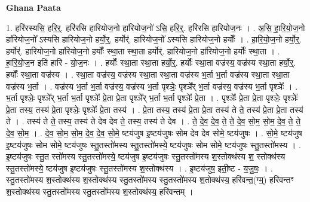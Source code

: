 \documentclass[17pt]{extarticle}
\begin{document}
\textbf{Ghana Paata } \newline

1. हरि॑रस्यसि॒ हरि॒र्॒. हरि॑रसि हारियोज॒नो हा॑रियोज॒नो॑ ऽसि॒ हरि॒र्॒. हरि॑रसि हारियोज॒नः । . अ॒सि॒ हा॒रि॒यो॒ज॒नो हा॑रियोज॒नो᳚ ऽस्यसि हारियोज॒नो हर्यो॒र्॒. हर्योर्॑. हारियोज॒नो᳚ ऽस्यसि हारियोज॒नो हर्योः᳚ । . हा॒रि॒यो॒ज॒नो हर्यो॒र्॒. हर्योर्॑. हारियोज॒नो हा॑रियोज॒नो हर्योः᳚ स्था॒ता स्था॒ता हर्योर्॑. हारियोज॒नो हा॑रियोज॒नो हर्योः᳚ स्था॒ता । . हा॒रि॒यो॒ज॒न इति॑ हारि - यो॒ज॒नः । . हर्योः᳚ स्था॒ता स्था॒ता हर्यो॒र्॒. हर्योः᳚ स्था॒ता वज्र॑स्य॒ वज्र॑स्य स्था॒ता हर्यो॒र्॒. हर्योः᳚ स्था॒ता वज्र॑स्य । . स्था॒ता वज्र॑स्य॒ वज्र॑स्य स्था॒ता स्था॒ता वज्र॑स्य भ॒र्ता भ॒र्ता वज्र॑स्य स्था॒ता स्था॒ता वज्र॑स्य भ॒र्ता । . वज्र॑स्य भ॒र्ता भ॒र्ता वज्र॑स्य॒ वज्र॑स्य भ॒र्ता पृश्ञेः॒ पृश्ञे᳚र् भ॒र्ता वज्र॑स्य॒ वज्र॑स्य भ॒र्ता पृश्ञेः᳚ । . भ॒र्ता पृश्ञेः॒ पृश्ञे᳚र् भ॒र्ता भ॒र्ता पृश्ञेः᳚ प्रे॒ता प्रे॒ता पृश्ञे᳚र् भ॒र्ता भ॒र्ता पृश्ञेः᳚ प्रे॒ता । . पृश्ञेः᳚ प्रे॒ता प्रे॒ता पृश्ञेः॒ पृश्ञेः᳚ प्रे॒ता तस्य॒ तस्य॑ प्रे॒ता पृश्ञेः॒ पृश्ञेः᳚ प्रे॒ता तस्य॑ । . प्रे॒ता तस्य॒ तस्य॑ प्रे॒ता प्रे॒ता तस्य॑ ते ते॒ तस्य॑ प्रे॒ता प्रे॒ता तस्य॑ ते । . तस्य॑ ते ते॒ तस्य॒ तस्य॑ ते देव देव ते॒ तस्य॒ तस्य॑ ते देव । . ते॒ दे॒व॒ दे॒व॒ ते॒ ते॒ दे॒व॒ सो॒म॒ सो॒म॒ दे॒व॒ ते॒ ते॒ दे॒व॒ सो॒म॒ । . दे॒व॒ सो॒म॒ सो॒म॒ दे॒व॒ दे॒व॒ सो॒मे॒ ष्टय॑जुष इ॒ष्टय॑जुषः सोम देव देव सोमे॒ ष्टय॑जुषः । . सो॒मे॒ ष्टय॑जुष इ॒ष्टय॑जुषः सोम सोमे॒ ष्टय॑जुषः स्तु॒तस्तो॑मस्य स्तु॒तस्तो॑मस्ये॒ ष्टय॑जुषः सोम सोमे॒ ष्टय॑जुषः स्तु॒तस्तो॑मस्य । . इ॒ष्टय॑जुषः स्तु॒त स्तो॑मस्य स्तु॒तस्तो॑मस्ये॒ ष्टय॑जुष इ॒ष्टय॑जुषः स्तु॒तस्तो॑मस्य श॒स्तोक्थ॑स्य श॒ स्तोक्थ॑स्य स्तु॒तस्तो॑मस्ये॒ ष्टय॑जुष इ॒ष्टय॑जुषः स्तु॒तस्तो॑मस्य श॒स्तोक्थ॑स्य । . इ॒ष्टय॑जुष॒ इती॒ष्ट - य॒जु॒षः॒ । . स्तु॒तस्तो॑मस्य श॒स्तोक्थ॑स्य श॒स्तोक्थ॑स्य स्तु॒तस्तो॑मस्य स्तु॒तस्तो॑मस्य श॒तोक्थ॑स्य॒ हरि॑वन्त॒(ग्म्॒) हरि॑वन्तꣳ श॒स्तोक्थ॑स्य स्तु॒तस्तो॑मस्य स्तु॒तस्तो॑मस्य श॒स्तोक्थ॑स्य॒ हरि॑वन्तम् । \newline
\end{document}

